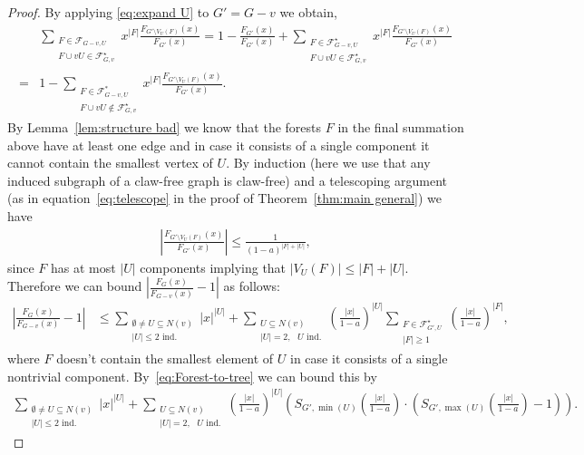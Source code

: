 \documentclass[a4paper,11pt,reqno]{amsart}
\numberwithin{equation}{section}
\begin{document}
\begin{proof}
By applying \eqref{eq:expand U} to $G'=G-v$ we obtain,
\begin{align*}
&\sum_{\substack{F\in \mathcal{F}_{G-v,U}\\F\cup vU \in \mathcal{F}^\star_{G,v}}}x^{|F|} \frac{F_{G'\setminus V_U(F)}(x)}{F_{G'}(x)}=1-\frac{F_{G'}(x)}{F_{G'}(x)}+\sum_{\substack{F\in \mathcal{F}^\star_{G-v,U}\\F\cup vU \in \mathcal{F}^\star_{G,v}}}x^{|F|} \frac{F_{G'\setminus V_U(F)}(x)}{F_{G'}(x)}
\\
=&1-\sum_{\substack{F\in \mathcal{F}^*_{G-v,U}\\F\cup vU \notin\mathcal{F}^\star_{G,v}}}x^{|F|}\frac{F_{G'\setminus V_U(F)}(x)}{F_{G'}(x)}.
\end{align*}
By Lemma~\ref{lem:structure bad} we know that the forests $F$ in the final summation above have at least one edge and in case it consists of a single component it cannot contain the smallest vertex of $U$. 
By induction (here we use that any induced subgraph of a claw-free graph is claw-free) and a telescoping argument (as in equation~\eqref{eq:telescope} in the proof of Theorem~\ref{thm:main general}) we have 
\begin{align}\label{eq:telescope_claw_free}
    \left|\frac{F_{G'\setminus V_U(F)}(x)}{F_{G'}(x)}\right|\leq \frac{1}{(1-a)^{|F|+|U|}},
\end{align}
since $F$ has at most $|U|$ components implying that $|V_U(F)|\leq |F|+|U|$.
Therefore we can bound $\left|\frac{F_{G}(x)}{F_{G-v}(x)}-1\right|$ as follows:
\begin{align*}
    \left|\frac{F_{G}(x)}{F_{G-v}(x)}-1\right|&\leq \sum_{\substack{\emptyset \neq U\subseteq N(v)\\ |U|\leq 2 \text{ ind.}}}|x|^{|U|}+\sum_{\substack{U\subseteq N(v)\\ |U|= 2, \text{ $U$ ind.}}} \left(\tfrac{|x|}{1-a}\right)^{|U|}\sum_{\substack{F\in \mathcal{F}^\star_{G',U}\\|F|\geq 1}}\left(\tfrac{|x|}{1-a}\right)^{|F|},  
 \end{align*}
where $F$ doesn't contain the smallest element of $U$ in case it consists of a single nontrivial component.
By~\eqref{eq:Forest-to-tree} we can bound this by
    \begin{align*}
    \sum_{\substack{\emptyset \neq U\subseteq N(v)\\ |U|\leq 2 \text{ ind.}}}|x|^{|U|}+\sum_{\substack{U\subseteq N(v)\\ |U|=2,  \text{ $U$ ind.}}} \left(\tfrac{|x|}{1-a}\right)^{|U|}\left(S_{G',\min(U)}\left(\tfrac{|x|}{1-a}\right)\cdot \left(S_{G',\max(U)}\left(\tfrac{|x|}{1-a}\right)-1\right)\right).  \label{eq:bound R part 1}
\end{align*}



\end{proof}
\end{document}
